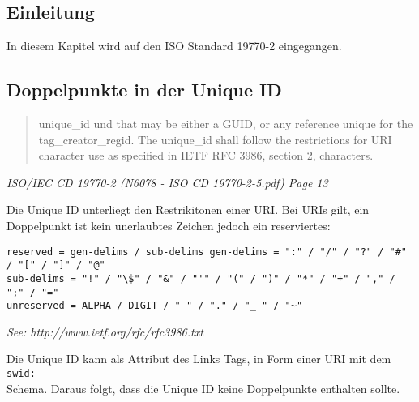 \subsection{Einleitung}

In diesem Kapitel wird auf den ISO Standard 19770-2 eingegangen. 

\subsection{Doppelpunkte in der Unique ID}
\begin{quote}
unique\_id und that may be either a GUID, or any reference unique for the tag\_creator\_regid. The unique\_id shall 
follow the restrictions for URI character use as specified in IETF RFC 3986, section 2, characters.
\end{quote}
\textit{ISO/IEC CD 19770-2 (N6078 - ISO CD 19770-2-5.pdf) Page 13}

Die Unique ID unterliegt den Restrikitonen einer URI. Bei URIs gilt, ein Doppelpunkt ist kein unerlaubtes Zeichen jedoch ein reserviertes: 

\begin{verbatim}
reserved = gen-delims / sub-delims gen-delims = ":" / "/" / "?" / "#" / "[" / "]" / "@" 
sub-delims = "!" / "\$" / "&" / "'" / "(" / ")" / "*" / "+" / "," / ";" / "="
unreserved = ALPHA / DIGIT / "-" / "." / "_ " / "~"
\end{verbatim}

\textit{See: http://www.ietf.org/rfc/rfc3986.txt}

Die Unique ID kann als Attribut des Links Tags, in Form einer URI mit dem \texttt{swid:\\} Schema. Daraus folgt, dass die Unique ID keine Doppelpunkte enthalten sollte.
